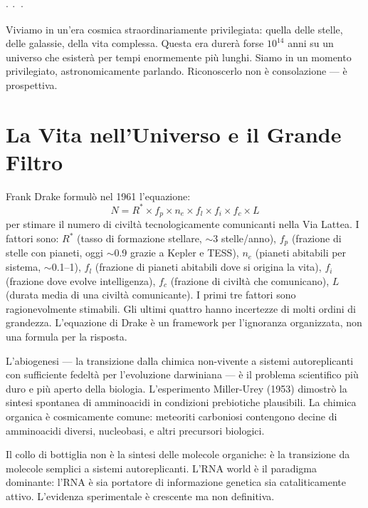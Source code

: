 \documentclass[12pt,a4paper,openany]{book}
\newcommand{\sezione}[1]{\vspace{1.2em}{\large\bfseries #1}\vspace{0.5em}\par}
\newcommand{\puntini}{\begin{center}$\cdot\ \cdot\ \cdot$\end{center}\vspace{0.3em}}
\begin{document}
\puntini

Viviamo in un'era cosmica straordinariamente privilegiata: quella delle stelle, delle galassie, della vita complessa. Questa era durerà forse $10^{14}$ anni su un universo che esisterà per tempi enormemente più lunghi. Siamo in un momento privilegiato, astronomicamente parlando. Riconoscerlo non è consolazione --- è prospettiva.

\chapter{La Vita nell'Universo e il Grande Filtro}

\sezione{L'equazione di Drake}

Frank Drake formulò nel 1961 l'equazione:
\[
N = R^* \times f_p \times n_e \times f_l \times f_i \times f_c \times L
\]
per stimare il numero di civiltà tecnologicamente comunicanti nella Via Lattea. I fattori sono: $R^*$ (tasso di formazione stellare, $\sim$3 stelle/anno), $f_p$ (frazione di stelle con pianeti, oggi $\sim$0.9 grazie a Kepler e TESS), $n_e$ (pianeti abitabili per sistema, $\sim$0.1--1), $f_l$ (frazione di pianeti abitabili dove si origina la vita), $f_i$ (frazione dove evolve intelligenza), $f_c$ (frazione di civiltà che comunicano), $L$ (durata media di una civiltà comunicante). I primi tre fattori sono ragionevolmente stimabili. Gli ultimi quattro hanno incertezze di molti ordini di grandezza. L'equazione di Drake è un framework per l'ignoranza organizzata, non una formula per la risposta.

\sezione{L'abiogenesi}

L'abiogenesi — la transizione dalla chimica non-vivente a sistemi autoreplicanti con sufficiente fedeltà per l'evoluzione darwiniana — è il problema scientifico più duro e più aperto della biologia. L'esperimento Miller-Urey (1953) dimostrò la sintesi spontanea di amminoacidi in condizioni prebiotiche plausibili. La chimica organica è cosmicamente comune: meteoriti carboniosi contengono decine di amminoacidi diversi, nucleobasi, e altri precursori biologici.

Il collo di bottiglia non è la sintesi delle molecole organiche: è la transizione da molecole semplici a sistemi autoreplicanti. L'RNA world è il paradigma dominante: l'RNA è sia portatore di informazione genetica sia cataliticamente attivo. L'evidenza sperimentale è crescente ma non definitiva.
\end{document}
